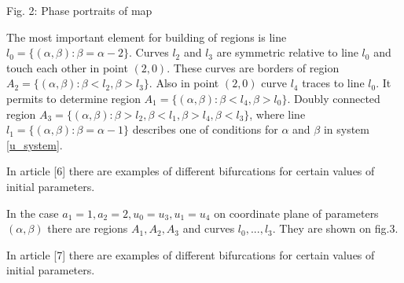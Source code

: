\documentclass[12pt]{amsart}
\begin{document}
\begin{center}
	Fig. 2: Phase portraits of map
\end{center}	

The most important element for building of regions is line $ l_0 = \{ (\alpha, \beta): \beta = \alpha-2 \} $. Curves $ l_2 $ and $ l_3 $ are symmetric relative to line $ l_0 $ and touch each other in point $ (2, 0) $. These curves are borders of region $ A_2 = \{ (\alpha, \beta): \beta < l_2, \beta > l_3 \} $. Also in point $ (2, 0) $ curve $ l_4 $ traces to line $ l_0 $. It permits to determine region $ A_1 = \{ (\alpha, \beta): \beta < l_4, \beta > l_0 \} $. Doubly connected region $ A_3 = \{ (\alpha, \beta): \beta > l_2, \beta < l_1, \beta > l_4, \beta < l_3 \} $, where line $ l_1 = \{ (\alpha, \beta): \beta = \alpha-1 \} $ describes one of conditions for $ \alpha $ and $ \beta $ in system \eqref{u_system}.

In article [6] there are examples of different bifurcations for certain values of initial parameters.

In the case $ a_1 = 1, a_2 = 2, u_0 = u_3, u_1 = u_4 $ on coordinate plane of parameters $ (\alpha, \beta) $ there are regions $ A_1, A_2, A_3 $ and curves $ l_0, ..., l_3 $. They are shown on fig.3.

\hspace{1.5cm}
\begin{minipage}[h]{0.65\linewidth}
\end{minipage}
\vspace{0.1cm}

In article [7] there are examples of different bifurcations for certain values of initial parameters.
\end{document}
